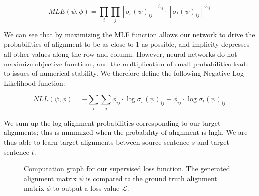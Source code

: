 \documentclass[twoside,twocolumn]{article}
\begin{document}
\begin{equation}
  MLE(\psi, \phi) = \prod_i \prod_j \left[ \sigma_s(\psi)_{ij} \right]^{\phi_{ij}} \cdot \left[ \sigma_t(\psi)_{ij} \right]^{\phi_{ij}}
\end{equation}

We can see that by maximizing the MLE function allows our network to
drive the probabilities of alignment to be as close to $1$ as possible,
and implicity depresses all other values along the row and column.
However, neural networks do not maximize objective functions, and
the multiplication of small probabilities leads to issues of numerical
stability. We therefore define the following Negative Log Likelihood function:

\begin{equation}
  NLL(\psi, \phi) = - \sum_i \sum_j  \phi_{ij} \cdot \log \sigma_s (\psi)_{ij} + \phi_{ij} \cdot \log \sigma_t (\psi)_{ij}
\end{equation}

We sum up the log alignment probabilities corresponding to our
target alignments; this is minimized when the probability of alignment is high.
We are thus able to learn target alignments between source sentence $s$ and
target sentence $t$.

\begin{figure}
  \centering
  \caption{Computation graph for our supervised loss function.
    The generated alignment matrix $\psi$ is compared to the ground
    truth alignment matrix $\phi$ to output a loss value $\mathcal{L}$.}
  \label{fig:supervised_loss}
\end{figure}
\end{document}
